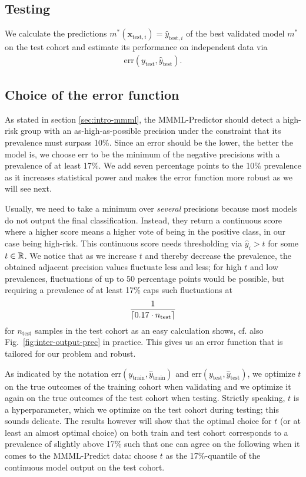\subsection{Testing}

We calculate the predictions $m^*(\mathbf{x}_{\text{test}, i}) = \hat{y}_{\text{test}, i}$ of the 
best validated model $m^*$ on the test cohort and estimate its performance on independent data via 
\begin{align}
    \text{err}(y_\text{test}, \hat{y}_\text{test}).
\end{align}

\subsection{Choice of the error function}\label{sec:error-function}

As stated in section \ref{sec:intro-mmml}, the MMML-Predictor should detect a high-risk group 
with an as-high-as-possible precision under the constraint that its prevalence must surpass 
\num{10}\%. Since an error should be the lower, the better the model is, we choose 
$\text{err}$ to be the minimum of the negative precisions with a prevalence of at least 17\%. We 
add seven percentage points to the \num{10}\% prevalence as it increases statistical power and makes 
the error function more robust as we will see next. 

Usually, we need 
to take a minimum over \textit{several} precisions because most models do not output the final 
classification.
Instead, they return a continuous score where a higher score means a higher vote of being
in the positive class, in our case being high-risk. This continuous score needs thresholding
via $\hat{y}_i > t$ for some $t \in \RR$.
We notice that as we increase $t$ and thereby decrease the prevalence, the obtained 
adjacent precision values fluctuate less and less; for high $t$ and low 
prevalences, fluctuations of up to \num{50} percentage points would be possible, but requiring a 
prevalence of at least 17\% caps such fluctuations at 
\begin{align}
    \frac{1}{\ceil*{\num{0.17} \cdot n_\text{test}}}
\end{align}
for $n_\text{test}$ samples in the test cohort as an easy calculation shows, cf. also Fig.\ 
\ref{fig:inter-output-prec} in practice. This gives us an error function that is tailored 
for our problem and robust.

As indicated by the notation $\text{err}(y_\text{train}, \hat{y}_\text{train})$ and 
$\text{err}(y_\text{test}, \hat{y}_\text{test})$, we optimize $t$ on the true outcomes 
of the training cohort when validating and we optimize it again on the true outcomes of the test cohort 
when testing. Strictly speaking, $t$ is a hyperparameter, which we optimize on the 
test cohort during testing; this sounds delicate. The results however will show that the optimal 
choice for $t$ (or at least an 
almost optimal choice) on both train and test cohort corresponds to a prevalence of 
slightly above 17\% such that one can agree on the following when it comes to the MMML-Predict data: 
choose $t$ as the 17\%-quantile of the continuous model output on the test cohort.

